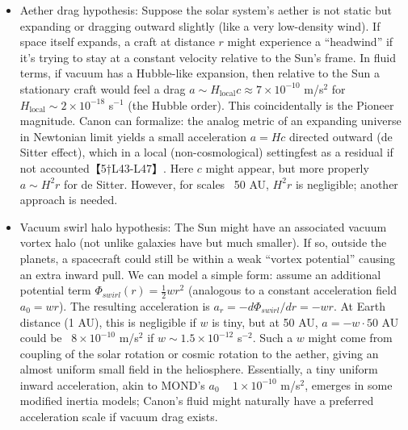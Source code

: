 \documentclass[11pt]{article}
\begin{document}
\begin{itemize}

\item 
Aether drag hypothesis: Suppose the solar system’s aether is not static but expanding or dragging outward slightly (like a very low-density wind). If space itself expands, a craft at distance $r$ might experience a “headwind” if it’s trying to stay at a constant velocity relative to the Sun’s frame. In fluid terms, if vacuum has a Hubble-like expansion, then relative to the Sun a stationary craft would feel a drag $a \sim H_{\text{local}} c \approx 7\times10^{-10}$ m/s$^2$ for $H_{\text{local}}\sim 2\times10^{-18}$ s$^{-1}$ (the Hubble order). This coincidentally is the Pioneer magnitude. Canon can formalize: the analog metric of an expanding universe in Newtonian limit yields a small acceleration $a = H c$ directed outward (de Sitter effect), which in a local (non-cosmological) settingfest as a residual if not accounted【5†L43-L47】. Here $c$ might appear, but more properly $a \sim H^2 r$ for de Sitter. However, for scales ~50 AU, $H^2 r$ is negligible; another approach is needed.




\item 
Vacuum swirl halo hypothesis: The Sun might have an associated vacuum vortex halo (not unlike galaxies have but much smaller). If so, outside the planets, a spacecraft could still be within a weak “vortex potential” causing an extra inward pull. We can model a simple form: assume an additional potential term $\Phi_{swirl}(r) = \frac{1}{2} w r^2$ (analogous to a constant acceleration field $a_0 = w r$). The resulting acceleration is $a_r = -d\Phi_{swirl}/dr = -w r$. At Earth distance (1 AU), this is negligible if $w$ is tiny, but at 50 AU, $a = -w \cdot 50$ AU could be ~$8\times10^{-10}$ m/s$^2$ if $w \sim 1.5\times10^{-12}$ s$^{-2}$. Such a $w$ might come from coupling of the solar rotation or cosmic rotation to the aether, giving an almost uniform small field in the heliosphere. Essentially, a tiny uniform inward acceleration, akin to MOND’s $a_0$ ~ $1\times10^{-10}$ m/s$^2$, emerges in some modified inertia models; Canon’s fluid might naturally have a preferred acceleration scale if vacuum drag exists.





\end{itemize}
\end{document}
